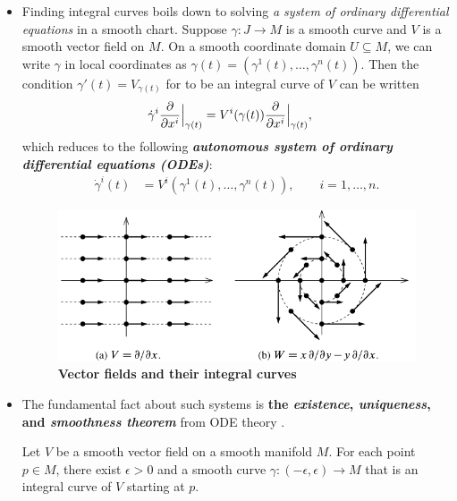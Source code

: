 \documentclass[11pt]{article}
\begin{document}
\begin{itemize}
\item \begin{remark}
Finding integral curves boils down to solving \emph{a system of ordinary differential equations} in a smooth chart.  Suppose $\gamma: J \rightarrow M$ is a smooth curve and $V$ is a smooth vector field on $M$. On a smooth coordinate domain $U \subseteq M$, we can write $\gamma$ in local coordinates as $\gamma(t) = (\gamma^{1}(t), \ldots, \gamma^{n}(t))$. Then the condition $\gamma'(t) =  V_{\gamma(t)}$ for to be an integral curve of $V$ can be written
\begin{align}
\dot{\gamma}^{i}\frac{\partial }{ \partial x^{i}}\Bigr|_{\gamma(t)} &= V^{i}(\gamma(t))\frac{\partial }{ \partial x^{i}}\Bigr|_{\gamma(t)}, \label{eqn: integral_curve_differential_equations_1}
\end{align} which reduces to the following \emph{\textbf{autonomous system of ordinary differential equations (ODEs)}}:
\begin{align}
\dot{\gamma}^{i}(t) &= V^{i}(\gamma^{1}(t), \ldots, \gamma^{n}(t)), \qquad i=1,\ldots, n.
\end{align}
\end{remark}

\begin{figure}
\begin{minipage}[htb]{1\linewidth}
  \centering
  \centerline{\includegraphics[scale = 0.5]{vector_fields_integral_curve.png}}
\end{minipage}
\caption{\footnotesize{\textbf{Vector fields and their integral curves \citep{lee2003introduction}}}}
\label{fig: vector_fields_integral_curve}
\end{figure}

\item The fundamental fact about such systems is \textbf{the \emph{existence}, \emph{uniqueness}, and \emph{smoothness theorem}} from ODE theory \citep{amann2011ordinary, hirsch2012differential}.
\begin{proposition}
Let $V$ be a smooth vector field on a smooth manifold $M$. For each point $p \in M$, there exist $\epsilon > 0$ and a smooth curve $\gamma: (-\epsilon, \epsilon) \rightarrow M$ that is an integral curve of $V$ starting at $p$.
\end{proposition}


\end{itemize}
\end{document}
